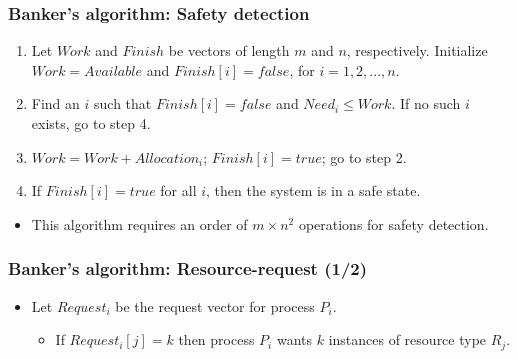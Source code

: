 \documentclass[CJKutf8,xcolor=pdftex,dvipsnames,table]{beamer}
\begin{document}
\begin{CJK*}{UTF8}{song}
  \begin{frame}
  \frametitle{Banker's algorithm: Safety detection} \pause
  \begin{enumerate}
  \item{Let $Work$ and $Finish$ be vectors of length $m$ and $n$, respectively. Initialize $Work = Available$ and $Finish[i] = false$, for $i=1, 2, ..., n$.} \pause
  \item{Find an $i$ such that \pause
      \newline
      $Finish[i] = false$ and $Need_i \leq Work$. \pause
      \newline
      If no such $i$ exists, go to step 4. \pause
    }
  \item{$Work = Work + Allocation_i$; $Finish[i] = true$; \newline go to step 2.} \pause
  \item{If $Finish[i] = true$ for all $i$, then the system is in a safe state.} \pause
  \end{enumerate}
  \begin{itemize}
  \item{This algorithm requires an order of $m \times n^2$ operations for safety detection.}
  \end{itemize}
  \end{frame}
  
  \begin{frame}
  \frametitle{Banker's algorithm: Resource-request (1/2)} \pause
  \begin{itemize}
  \item{Let $Request_i$ be the request vector for process $P_i$. } \pause
    \begin{itemize}
    \item{If $Request_i[j] = k$ then process $P_i$ wants $k$ instances of resource type $R_j$.}
    \end{itemize}
  \end{itemize}
  \end{frame}
  

\end{CJK*}
\end{document}
